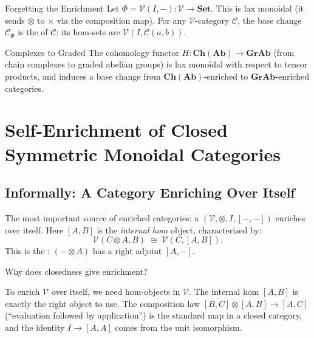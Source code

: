 \begin{example}{Forgetting the Enrichment}
Let $\Phi = \mathcal{V}(I,-) : \mathcal{V} \to \mathbf{Set}$. This is lax
monoidal (it sends $\otimes$ to $\times$ via the composition map). For any
$\mathcal{V}$-category $\mathcal{C}$, the base change $\mathcal{C}_\Phi$ is the
 of $\mathcal{C}$: its hom-sets are
$\mathcal{V}(I, \mathcal{C}(a,b))$.
\end{example}

\begin{example}{Complexes to Graded}
The cohomology functor $H : \mathbf{Ch}(\mathbf{Ab}) \to \mathbf{GrAb}$ (from
chain complexes to graded abelian groups) is lax monoidal with respect to
tensor products, and induces a base change from $\mathbf{Ch}(\mathbf{Ab})$-enriched
to $\mathbf{GrAb}$-enriched categories.
\end{example}


\section{Self-Enrichment of Closed Symmetric Monoidal Categories}
\label{sec:self-enrichment}

\subsection{Informally: A Category Enriching Over Itself}

The most important source of enriched categories: a  $(\mathcal{V}, \otimes, I, [-,-])$ enriches over itself.
Here $[A, B]$ is the \emph{internal hom} object, characterized by:
\begin{equation*}
  \mathcal{V}(C \otimes A, B) \;\cong\; \mathcal{V}(C, [A,B]).
\end{equation*}
This is the : $(- \otimes A)$ has a right adjoint $[A,-]$.

\begin{dialog}
Why does closedness give enrichment?

To enrich $\mathcal{V}$ over itself, we need hom-objects in $\mathcal{V}$.
The internal hom $[A, B]$ is exactly the right object to use. The composition
law $[B,C] \otimes [A,B] \to [A,C]$ (``evaluation followed by application'')
is the standard map in a closed category, and the identity $I \to [A,A]$
comes from the unit isomorphism.
\end{dialog}

